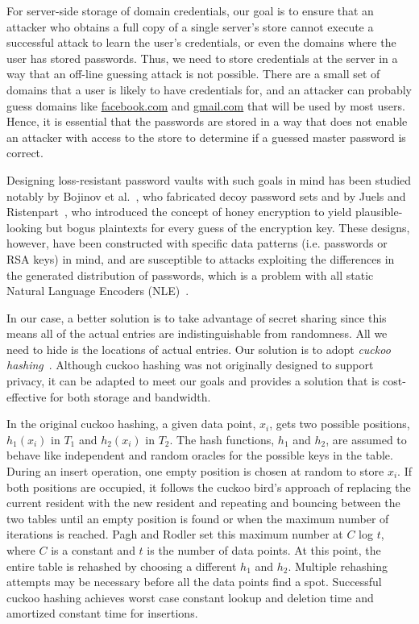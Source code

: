 
For server-side storage of domain credentials, our goal is to ensure that an attacker who obtains a full copy of a single server's store cannot execute a successful attack to learn the user's credentials, or even the domains where the user has stored passwords. Thus, we need to store credentials at the server in a way that an off-line guessing attack is not possible. There are a small set of domains that a user is likely to have credentials for, and an attacker can probably guess domains like \url{facebook.com} and \url{gmail.com} that will be used by most users. Hence, it is essential that the passwords are stored in a way that does not enable an attacker with access to the store to determine if a guessed master password is correct.

Designing loss-resistant password vaults with such goals in mind has been studied notably by Bojinov et al.~\cite{bojinov2010kamouflage}, who fabricated decoy password sets and by Juels and Ristenpart~\cite{juels2014honey}, who introduced the concept of honey encryption to yield plausible-looking but bogus plaintexts for every guess of the encryption key. These designs, however, have been constructed with specific data patterns (i.e. passwords or RSA keys) in mind, and are susceptible to attacks exploiting the differences in the generated distribution of passwords, which is a problem with all static Natural Language Encoders (NLE)~\cite{Golla2016}.  

In our case, a better solution is to take advantage of secret sharing since this means all of the actual entries are indistinguishable from randomness. All we need to hide is the locations of actual entries.  Our solution is to adopt \textit{cuckoo hashing}~\cite{Pagh2001}. Although cuckoo hashing was not originally designed to support privacy, it can be adapted to meet our goals and provides a solution that is cost-effective for both storage and bandwidth. 

In the original cuckoo hashing, a given data point, $x_i$, gets two possible positions, $h_1(x_i)$ in $T_1$ and $h_2(x_i)$ in $T_2$. The hash functions, $h_1$ and $h_2$, are assumed to behave like independent and random oracles for the possible keys in the table. During an insert operation, one empty position is chosen at random to store $x_i$. If both positions are occupied, it follows the cuckoo bird's approach of replacing the current resident with the new resident and repeating and bouncing between the two tables until an empty position is found or when the maximum number of iterations is reached. Pagh and Rodler set this maximum number at $C$ log $t$, where $C$ is a constant and $t$ is the number of data points. At this point, the entire table is rehashed by choosing a different $h_1$ and $h_2$. Multiple rehashing attempts may be necessary before all the data points find a spot. Successful cuckoo hashing achieves worst case constant lookup and deletion time and amortized constant time for insertions.

